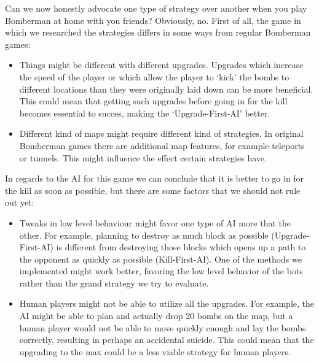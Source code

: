 %
Can we now honestly advocate one type of strategy over another when you play
Bomberman at home with you friends? Obviously, no.
First of all, the game in which we researched the strategies differs in some
ways from regular Bomberman games:
\begin{itemize}
\item Things might be different with different upgrades. Upgrades which increase
the speed of the player or which allow the player to `kick' the bombs to different
locations than they were originally laid down can be more beneficial. This could
mean that getting such upgrades before going in for the kill becomes essential
to succes, making the `Upgrade-First-AI' better.
\item Different kind of maps might require different kind of strategies. In
original Bomberman games there are additional map features, for example
teleports or tunnels. This might influence the effect certain strategies have.
\end{itemize}

In regards to the AI for this game we can conclude that it is better to go in
for the kill as soon as possible, but there are some factors that we should
not rule out yet:
\begin{itemize}
\item Tweaks in low level behaviour might favor one type of AI more that the
other. For example, planning to destroy as much block as possible
(Upgrade-First-AI) is different from destroying those blocks which opens up
a path to the opponent as quickly as possible (Kill-First-AI). One of the
methods we implemented might work better, favoring the low level behavior
of the bots rather than the grand strategy we try to evaluate.
\item Human players might not be able to utilize all the upgrades. For example,
the AI might be able to plan and actually drop 20 bombs on the map, but a human player
would not be able to move quickly enough and lay the bombs correctly, resulting
in perhaps an accidental suicide. This could mean that the upgrading to the max
could be a less viable strategy for human players.
\end{itemize}
